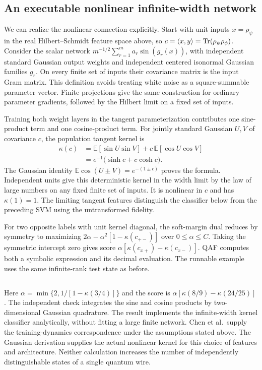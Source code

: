 \subsection{An executable nonlinear infinite-width network}
We can realize the nonlinear connection explicitly. Start with unit inputs $x=\rho_\psi$ in the real Hilbert--Schmidt feature space above, so $c=\langle x,y\rangle=\operatorname{Tr}(\rho_\psi\rho_\phi)$. Consider the scalar network $m^{-1/2}\sum_{r=1}^{m}a_r\sin(g_r(x))$, with independent standard Gaussian output weights and independent centered isonormal Gaussian families $g_r$. On every finite set of inputs their covariance matrix is the input Gram matrix. This definition avoids treating white noise as a square-summable parameter vector. Finite projections give the same construction for ordinary parameter gradients, followed by the Hilbert limit on a fixed set of inputs.

Training both weight layers in the tangent parameterization contributes one sine-product term and one cosine-product term. For jointly standard Gaussian $U,V$ of covariance $c$, the population tangent kernel is
\begin{align}
 \kappa(c)
 &=\mathbb E[\sin U\sin V]+c\,\mathbb E[\cos U\cos V] \nonumber\\
 &=e^{-1}\bigl(\sinh c+c\cosh c\bigr). \label{eq:sine}
\end{align}
The Gaussian identity $\mathbb E\cos(U\pm V)=e^{-(1\pm c)}$ proves the formula. Independent units give this deterministic kernel in the width limit by the law of large numbers on any fixed finite set of inputs. It is nonlinear in $c$ and has $\kappa(1)=1$. The limiting tangent features distinguish the classifier below from the preceding SVM using the untransformed fidelity.

For two opposite labels with unit kernel diagonal, the soft-margin dual reduces by symmetry to maximizing $2\alpha-\alpha^2[1-\kappa(c_{+-})]$ over $0\le\alpha\le C$. Taking the symmetric intercept zero gives score $\alpha[\kappa(c_{x+})-\kappa(c_{x-})]$. QAF computes both a symbolic expression and its decimal evaluation. The runnable example uses the same infinite-rank test state as before.
\inputminted{qaf}{../../examples/prefix/nonlinear.qaf}
Here $\alpha=\min\{2,1/[1-\kappa(3/4)]\}$ and the score is $\alpha[\kappa(8/9)-\kappa(24/25)]$. The independent check integrates the sine and cosine products by two-dimensional Gaussian quadrature. The result implements the infinite-width kernel classifier analytically, without fitting a large finite network. Chen et al.\ supply the training-dynamics correspondence under the assumptions stated above. The Gaussian derivation supplies the actual nonlinear kernel for this choice of features and architecture. Neither calculation increases the number of independently distinguishable states of a single quantum wire.
